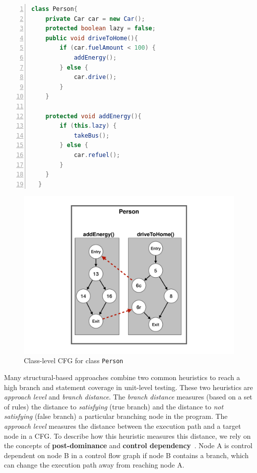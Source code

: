 \begin{lstlisting}[frame=tb,
    caption={Class \texttt{Person}},
    label=list:ClassA,
    language=java,
    captionpos=t,
    numbers=left,
    belowskip=-2.5em,
    float=t,
    firstnumber=1]
class Person{
    private Car car = new Car();
    protected boolean lazy = false;
    public void driveToHome(){
        if (car.fuelAmount < 100) {
            addEnergy();
        } else {
            car.drive();
        }   
    }

    protected void addEnergy(){
        if (this.lazy) {
            takeBus();
        } else {
            car.refuel();
        }
    }   
  }
  \end{lstlisting}

  \begin{figure}[t]
    \centering
	\includegraphics[width=0.85\linewidth]{figs/CCFG_new}
	\caption{Class-level CFG for class \texttt{Person}}
  \label{fig:CCFG}
\end{figure}


Many structural-based approaches combine two common heuristics to reach a high branch and statement coverage in unit-level testing. These two heuristics  are \textit{approach level} and \textit{branch distance}.
The \textit{branch distance} measures (based on a set of rules) the distance to \textit{satisfying} (true branch) and the distance to \textit{not satisfying} (false branch) a particular branching node in the program.
The \textit{approach level} measures the distance between the execution path and a target node in a CFG. To describe how this heuristic measures this distance, we 
rely on the concepts of \textbf{post-dominance} and \textbf{control dependency}~\cite{Allen:1970:CFA:800028.808479}. Node A is control dependent on node B in a control flow graph if node B contains a branch, which can change the execution path away from reaching node A.

